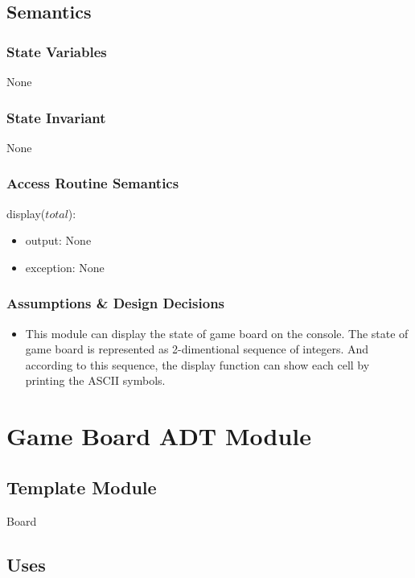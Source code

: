 \documentclass[12pt]{article}
\begin{document}
\subsection* {Semantics}

\subsubsection* {State Variables}

None

\subsubsection* {State Invariant}

None

\subsubsection* {Access Routine Semantics}

display($total$):
\begin{itemize}
\item output: None
\item exception: None
\end{itemize}

\subsubsection* {Assumptions \& Design Decisions}
\begin{itemize}
\item
This module can display the state of game board on the console. The state of game
board is represented as 2-dimentional sequence of integers. And according to this
sequence, the display function can show each cell by printing the ASCII symbols.
\end{itemize}
\newpage




\section* {Game Board ADT Module}

\subsection*{Template Module}

Board

\subsection* {Uses}
\end{document}
